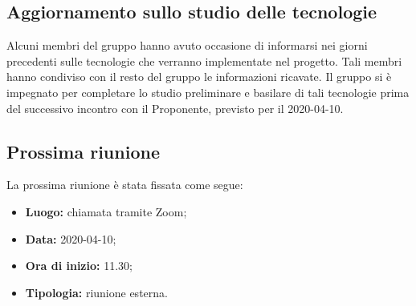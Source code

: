 	\subsection{Aggiornamento sullo studio delle tecnologie}
	Alcuni membri del gruppo hanno avuto occasione di informarsi nei giorni precedenti sulle tecnologie che verranno implementate nel progetto. Tali membri hanno condiviso con il resto del gruppo le informazioni ricavate. Il gruppo si è impegnato per completare lo studio preliminare e basilare di tali tecnologie prima del successivo incontro con il Proponente, previsto per il 2020-04-10.

	\subsection{Prossima riunione}
		La prossima riunione è stata fissata come segue:
		\begin{itemize}
			\item \textbf{Luogo: } chiamata tramite Zoom;
			\item \textbf{Data: } 2020-04-10;
			\item \textbf{Ora di inizio: } 11.30;
			\item \textbf{Tipologia: } riunione esterna.
		\end{itemize}
